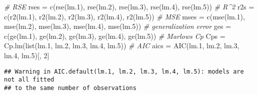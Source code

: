 \documentclass[
]{article}
\newenvironment{Shaded}{\begin{snugshade}}{\end{snugshade}}
\newcommand{\CommentTok}[1]{\textcolor[rgb]{0.56,0.35,0.01}{\textit{#1}}}
\newcommand{\DecValTok}[1]{\textcolor[rgb]{0.00,0.00,0.81}{#1}}
\newcommand{\FloatTok}[1]{\textcolor[rgb]{0.00,0.00,0.81}{#1}}
\newcommand{\FunctionTok}[1]{\textcolor[rgb]{0.00,0.00,0.00}{#1}}
\newcommand{\NormalTok}[1]{#1}
\newcommand{\OtherTok}[1]{\textcolor[rgb]{0.56,0.35,0.01}{#1}}
\begin{document}
\begin{Shaded}
\begin{Highlighting}[]
\CommentTok{\# RSE}
\NormalTok{rses }\OtherTok{=} \FunctionTok{c}\NormalTok{(}\FunctionTok{rse}\NormalTok{(lm}\FloatTok{.1}\NormalTok{), }\FunctionTok{rse}\NormalTok{(lm}\FloatTok{.2}\NormalTok{), }\FunctionTok{rse}\NormalTok{(lm}\FloatTok{.3}\NormalTok{), }\FunctionTok{rse}\NormalTok{(lm}\FloatTok{.4}\NormalTok{), }\FunctionTok{rse}\NormalTok{(lm}\FloatTok{.5}\NormalTok{))}
\CommentTok{\# R\^{}2}
\NormalTok{r2s }\OtherTok{=} \FunctionTok{c}\NormalTok{(}\FunctionTok{r2}\NormalTok{(lm}\FloatTok{.1}\NormalTok{), }\FunctionTok{r2}\NormalTok{(lm}\FloatTok{.2}\NormalTok{), }\FunctionTok{r2}\NormalTok{(lm}\FloatTok{.3}\NormalTok{), }\FunctionTok{r2}\NormalTok{(lm}\FloatTok{.4}\NormalTok{), }\FunctionTok{r2}\NormalTok{(lm}\FloatTok{.5}\NormalTok{))}
\CommentTok{\# MSE}
\NormalTok{mses }\OtherTok{=} \FunctionTok{c}\NormalTok{(}\FunctionTok{mse}\NormalTok{(lm}\FloatTok{.1}\NormalTok{), }\FunctionTok{mse}\NormalTok{(lm}\FloatTok{.2}\NormalTok{), }\FunctionTok{mse}\NormalTok{(lm}\FloatTok{.3}\NormalTok{), }\FunctionTok{mse}\NormalTok{(lm}\FloatTok{.4}\NormalTok{), }\FunctionTok{mse}\NormalTok{(lm}\FloatTok{.5}\NormalTok{))}
\CommentTok{\# generalization error}
\NormalTok{ges }\OtherTok{=} \FunctionTok{c}\NormalTok{(}\FunctionTok{ge}\NormalTok{(lm}\FloatTok{.1}\NormalTok{), }\FunctionTok{ge}\NormalTok{(lm}\FloatTok{.2}\NormalTok{), }\FunctionTok{ge}\NormalTok{(lm}\FloatTok{.3}\NormalTok{), }\FunctionTok{ge}\NormalTok{(lm}\FloatTok{.4}\NormalTok{), }\FunctionTok{ge}\NormalTok{(lm}\FloatTok{.5}\NormalTok{))}
\CommentTok{\# Marlow\textquotesingle{}s Cp}
\NormalTok{Cps }\OtherTok{=} \FunctionTok{Cp.lm}\NormalTok{(}\FunctionTok{list}\NormalTok{(lm}\FloatTok{.1}\NormalTok{, lm}\FloatTok{.2}\NormalTok{, lm}\FloatTok{.3}\NormalTok{, lm}\FloatTok{.4}\NormalTok{, lm}\FloatTok{.5}\NormalTok{))}
\CommentTok{\# AIC}
\NormalTok{aics }\OtherTok{=} \FunctionTok{AIC}\NormalTok{(lm}\FloatTok{.1}\NormalTok{, lm}\FloatTok{.2}\NormalTok{, lm}\FloatTok{.3}\NormalTok{, lm}\FloatTok{.4}\NormalTok{, lm}\FloatTok{.5}\NormalTok{)[, }\DecValTok{2}\NormalTok{]}
\end{Highlighting}
\end{Shaded}

\begin{verbatim}
## Warning in AIC.default(lm.1, lm.2, lm.3, lm.4, lm.5): models are not all fitted
## to the same number of observations
\end{verbatim}
\end{document}
